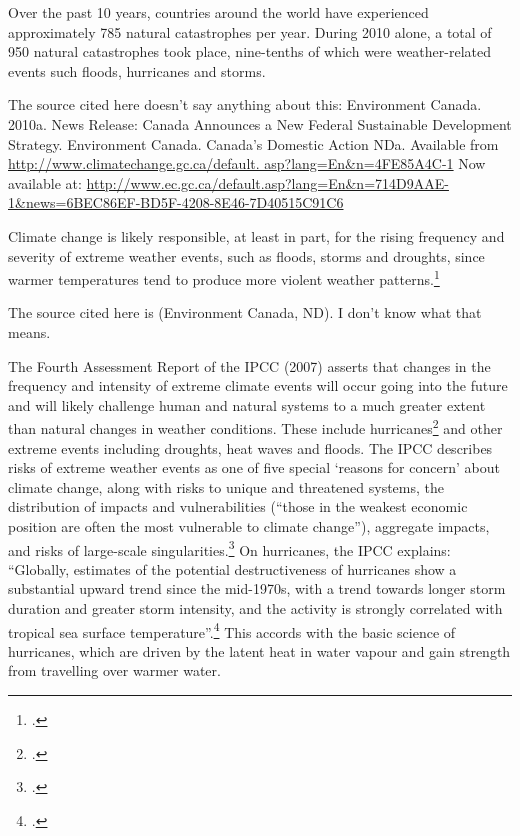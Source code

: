 Over the past 10 years, countries around the world have experienced approximately 785 natural catastrophes per year. 
During 2010 alone, a total of 950 natural catastrophes took place, nine-tenths of which were weather-related events such floods, hurricanes and storms.

\begin{vcom}
The source cited here doesn't say anything about this: Environment Canada. 2010a. News Release: Canada Announces a New Federal Sustainable Development Strategy. Environment Canada. Canada’s Domestic Action NDa. Available from \url{http://www.climatechange.gc.ca/default. asp?lang=En&n=4FE85A4C-1} Now available at: \url{http://www.ec.gc.ca/default.asp?lang=En&n=714D9AAE-1&news=6BEC86EF-BD5F-4208-8E46-7D40515C91C6}
\end{vcom}

Climate change is likely responsible, at least in part, for the rising frequency and severity of extreme weather events, such as floods, storms and droughts, since warmer temperatures tend to produce more violent weather patterns.\footcite[See: ][]{IPCCHurricane} 

\begin{vcom}
The source cited here is (Environment Canada, ND). I don't know what that means.
\end{vcom}

The Fourth Assessment Report of the IPCC (2007) asserts that changes in the frequency and intensity of extreme climate events will occur going into the future and will likely challenge human and natural systems to a much greater extent than natural changes in weather conditions.
These include hurricanes\footcite[][]{Knutson2004} and other extreme events including droughts, heat waves and floods.
The IPCC describes risks of extreme weather events as one of five special `reasons for concern' about climate change, along with risks to unique and threatened systems, the distribution of impacts and vulnerabilities (``those in the weakest economic position are often the most vulnerable to climate change''), aggregate impacts, and risks of large-scale singularities.\footcite[][See: "The long-term perspective" \url{https://www.ipcc.ch/publications_and_data/ar4/syr/en/spms5.html}"]{IPCC2007}
On hurricanes, the IPCC explains: ``Globally, estimates of the potential destructiveness of hurricanes show a substantial upward trend since the mid-1970s, with a trend towards longer storm duration and greater storm intensity, and the activity is strongly correlated with tropical sea surface temperature''.\footcite[][]{IPCCHurricane}
This accords with the basic science of hurricanes, which are driven by the latent heat in water vapour and gain strength from travelling over warmer water.


